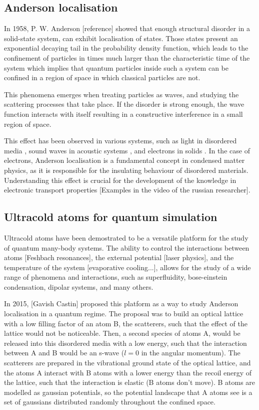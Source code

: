 \subsection{Anderson localisation}

In 1958, P. W. Anderson [reference] showed that enough structural disorder in a solid-state system, can exhibit localisation of states. Those states present an exponential decaying tail in the probability density function, which leads to the confinement of particles in times much larger than the characteristic time of the system which implies that quantum particles inside such a system can be confined in a region of space in which classical particles are not.

This phenomena emerges when treating particles as waves, and studying the scattering processes that take place. If the disorder is strong enough, the wave function interacts with itself resulting in a constructive interference in a small region of space.

This effect has been observed in various systems, such as light in disordered media \cite{wiersma_localization_1997}, sound waves in acoustic systems \cite{hu_localization_2018}, and electrons in solids \cite{abrahams_scaling_1979}. In the case of electrons, Anderson localisation is a fundamental concept in condensed matter physics, as it is responsible for the insulating behaviour of disordered materials. Understanding this effect is crucial for the development of the knowledge in electronic transport properties [Examples in the video of the russian researcher].

\subsection{Ultracold atoms for quantum simulation}

Ultracold atoms have been demostrated to be a versatile platform for the study of quantum many-body systems. The ability to control the interactions between atoms [Feshbach resonances], the external potential [laser physics], and the temperature of the system [evaporative cooling...], allows for the study of a wide range of phenomena and interactions, such as superfluidity, bose-einstein condensation, dipolar systems, and many others.

In 2015, [Gavish Castin] proposed this platform as a way to study Anderson localisation in a quantum regime. The proposal was to build an optical lattice with a low filling factor of an atom B, the scatterers, such that the effect of the lattice would not be noticeable. Then, a second species of atoms A, would be released into this disordered media with a low energy, such that the interaction between A and B would be an s-wave ($l=0$ in the angular momentum). The scatterers are prepared in the vibrational ground state of the optical lattice, and the atoms A interact with B atoms with a lower energy than the recoil energy of the lattice, such that the interaction is elastic (B atoms don't move). B atoms are modelled as gaussian potentials, so the potential landscape that A atoms see is a set of gaussians distributed randomly throughout the confined space.

